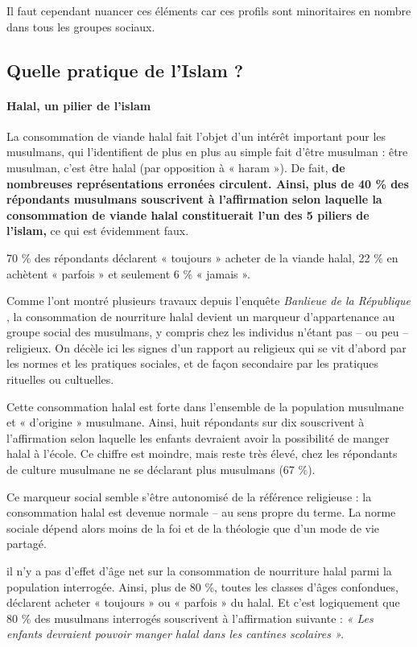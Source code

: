 Il faut cependant nuancer ces éléments car ces profils sont minoritaires
en nombre dans tous les groupes sociaux.


  \subsection{Quelle pratique de l'Islam ?}


\paragraph{Halal, un pilier de l'islam} La consommation de viande halal fait l'objet d'un intérêt important pour
les musulmans, qui l'identifient de plus en plus au simple fait d'être
musulman : être musulman, c'est être halal (par opposition à « haram »).
De fait, \textbf{de nombreuses représentations erronées circulent.
Ainsi, plus de 40 \% des répondants musulmans souscrivent à
l'affirmation selon laquelle la consommation de viande halal
constituerait l'un des 5 piliers de l'islam,} ce qui est évidemment
faux.

70 \% des répondants déclarent « toujours » acheter de la viande halal,
22 \% en achètent « parfois » et seulement 6 \% « jamais ».

Comme l'ont montré plusieurs travaux depuis l'enquête \emph{Banlieue de
la République }, la consommation de nourriture halal devient un
marqueur d'appartenance au groupe social des musulmans, y compris chez
les individus n'étant pas -- ou peu --
religieux. On décèle ici les signes d'un rapport au religieux qui se vit
d'abord par les normes et les pratiques sociales, et de façon secondaire
par les pratiques rituelles ou cultuelles.

Cette consommation halal est forte dans l'ensemble de la population
musulmane et
« d'origine » musulmane. Ainsi, huit répondants sur dix souscrivent à
l'affirmation selon laquelle les enfants devraient avoir la possibilité
de manger halal à l'école. Ce chiffre est moindre, mais reste très
élevé, chez les répondants de culture musulmane ne se déclarant plus
musulmans (67 \%).

Ce marqueur social semble s'être autonomisé de la référence religieuse :
la consommation halal est devenue normale -- au sens propre du terme. La
norme sociale dépend alors moins de la foi et de la théologie que d'un
mode de vie partagé.

 il n'y a pas d'effet d'âge net sur
la consommation de nourriture halal parmi la population interrogée.
Ainsi, plus de 80 \%, toutes les classes d'âges confondues, déclarent
acheter « toujours » ou
« parfois » du halal. Et c'est logiquement que 80 \% des musulmans
interrogés souscrivent à l'affirmation suivante : \emph{« Les enfants
devraient pouvoir manger halal dans les cantines scolaires ».}

